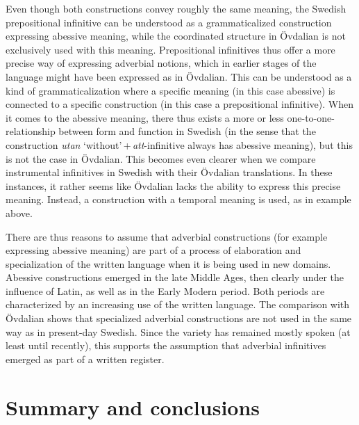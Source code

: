 \documentclass[output=paper]{langscibook}
\begin{document}
Even though both constructions convey roughly the same meaning, the Swedish prepositional infinitive can be understood as a grammaticalized construction expressing abessive meaning, while the coordinated structure in Övdalian is not exclusively used with this meaning. Prepositional infinitives thus offer a more precise way of expressing adverbial notions, which in earlier stages of the language might have been expressed as in Övdalian. This can be understood as a kind of grammaticalization where a specific meaning (in this case abessive) is connected to a specific construction (in this case a prepositional infinitive). When it comes to the abessive meaning, there thus exists a more or less one-to-one-relationship between form and function in Swedish (in the sense that the construction \textit{utan} ‘without’\,+\,\textit{att}-infinitive always has abessive meaning), but this is not the case in Övdalian. This becomes even clearer when we compare instrumental infinitives in Swedish with their Övdalian translations. In these instances, it rather seems like Övdalian lacks the ability to express this precise meaning. Instead, a construction with a temporal meaning is used, as in example  above. 



There are thus reasons to assume that adverbial constructions (for example expressing abessive meaning) are part of a process of elaboration and specialization of the written language when it is being used in new domains. Abessive constructions emerged in the late Middle Ages, then clearly under the influence of Latin, as well as in the Early Modern period. Both periods are characterized by an increasing use of the written language. The comparison with Övdalian shows that specialized adverbial constructions are not used in the same way as in present-day Swedish. Since the variety has remained mostly spoken (at least until recently), this supports the assumption that adverbial infinitives emerged as part of a written register.  


\section{Summary and conclusions}\label{sec:kalm:6}
\end{document}
